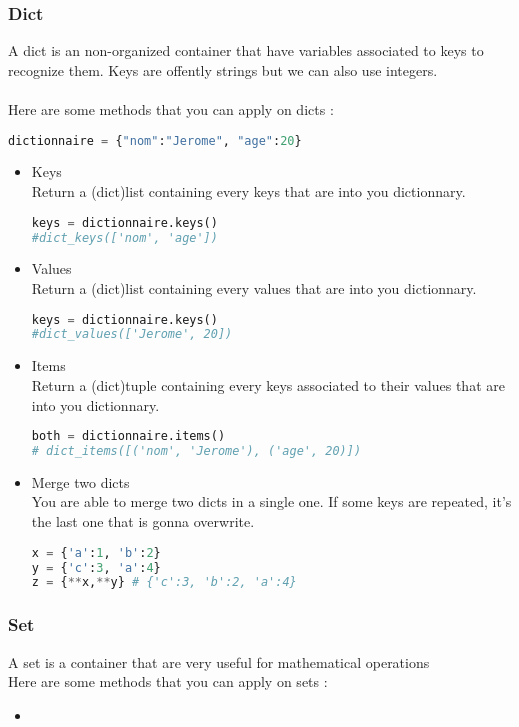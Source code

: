 \documentclass[a4paper, 12pt, titlepage]{scrartcl} %
\begin{document}
\subsubsection{Dict}
A dict is an non-organized container that have variables associated to keys to recognize them. Keys are offently strings but we can also use integers.\\ \\
Here are some methods that you can apply on dicts : 
\begin{lstlisting}[language=Python]
dictionnaire = {"nom":"Jerome", "age":20}
\end{lstlisting}

\begin{itemize}
\item Keys \\
Return a (dict)list containing every keys that are into you dictionnary.
\begin{lstlisting}[language=Python]
keys = dictionnaire.keys()
#dict_keys(['nom', 'age'])
\end{lstlisting}

\item Values \\
Return a (dict)list containing every values that are into you dictionnary.
\begin{lstlisting}[language=Python]
keys = dictionnaire.keys()
#dict_values(['Jerome', 20])
\end{lstlisting}

\item Items \\
Return a (dict)tuple containing every keys associated to their values that are into you dictionnary.
\begin{lstlisting}[language=Python]
both = dictionnaire.items()
# dict_items([('nom', 'Jerome'), ('age', 20)])
\end{lstlisting}
\item Merge two dicts \\
You are able to merge two dicts in a single one. If some keys are repeated, it's the last one that is gonna overwrite.
\begin{lstlisting}[language=Python]
x = {'a':1, 'b':2}
y = {'c':3, 'a':4}
z = {**x,**y} # {'c':3, 'b':2, 'a':4}
\end{lstlisting}
\end{itemize}


\subsubsection{Set}
A set is a container that are very useful for mathematical operations\\
Here are some methods that you can apply on sets : 
\begin{itemize}
\item
\end{itemize}
\end{document}
